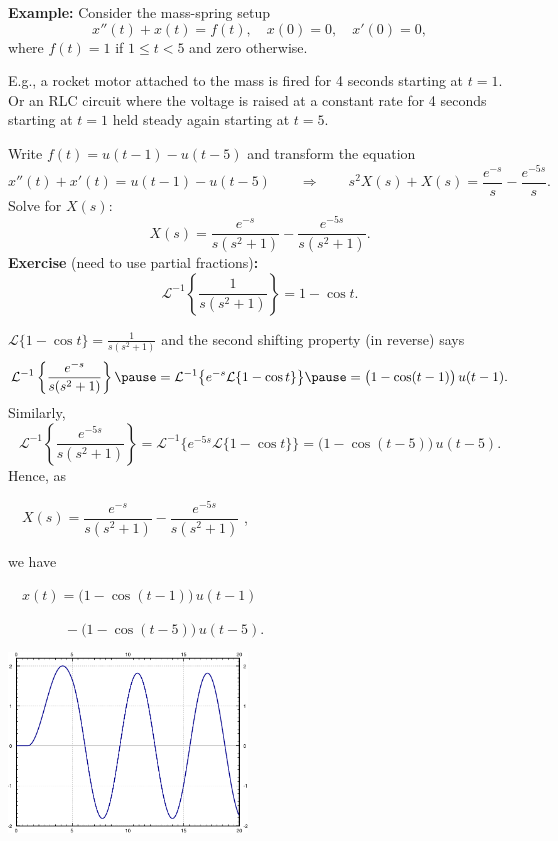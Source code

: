 \documentclass[10pt,aspectratio=169]{beamer}
\begin{document}
\begin{frame}
\textbf{Example:}
Consider the mass-spring setup
\begin{equation*}
x''(t) + x(t) = f(t) , \quad x(0) = 0, \quad x'(0) = 0,
\end{equation*}
where $f(t) = 1$ if $1 \leq t < 5$ and zero otherwise.

\pause
\medskip

E.g., a rocket motor attached to the mass is fired for 4 seconds starting at
$t=1$. \pause  Or an RLC circuit where the voltage is raised
at a constant rate for 4 seconds starting at $t=1$ held steady 
again starting at $t=5$.

\pause
\medskip

Write $f(t) = u(t-1) - u(t-5)$ and transform the equation
\[
x''(t) + x'(t) = 
u(t-1) - u(t-5)
\qquad
\Rightarrow
\qquad
s^2 X(s) + X(s) = \frac{e^{-s}}{s} - \frac{e^{-5s}}{s} .
\]
\pause
Solve for $X(s)$:
\[
X(s) = \frac{e^{-s}}{s(s^2+1)} - \frac{e^{-5s}}{s(s^2+1)} .
\]
\pause
\textbf{Exercise} (need to use partial fractions)\textbf{:}
\begin{equation*}
{\mathcal{L}}^{-1} \left\{ \frac{1}{s(s^2+1)} \right\}
= 1 - \cos t .
\end{equation*}
\end{frame}

\begin{frame}
$\mathcal{L} \{ 1 - \cos t  \} = \frac{1}{s(s^2+1)}$ and the
second shifting property (in reverse) says
\[
{\mathcal{L}}^{-1} \left\{ \frac{e^{-s}}{s(s^2+1)} \right\}
\pause
=
{\mathcal{L}}^{-1} \bigl\{
e^{-s}
\mathcal{L} \{ 1 - \cos t \}
\bigr\}
\pause
=
\bigl( 1 - \cos (t-1) \bigr) \, u(t-1) .
\]
\pause
Similarly,
\[
{\mathcal{L}}^{-1} \left\{ \frac{e^{-5s}}{s(s^2+1)} \right\}
=
{\mathcal{L}}^{-1} \bigl\{
e^{-5s}
\mathcal{L} \{ 1 - \cos t \}
\bigr\}
=
\bigl( 1 - \cos (t-5) \bigr) \, u(t-5) .
\]
\pause
Hence, as

\bigskip

$\quad
X(s) = \dfrac{e^{-s}}{s(s^2+1)} - \dfrac{e^{-5s}}{s(s^2+1)}$ ,

\bigskip
\pause

we have

\medskip

$
\quad
x(t) = 
\bigl( 1 - \cos (t-1) \bigr) \, u(t-1) $

\medskip

$\qquad\qquad {} -
\bigl( 1 - \cos (t-5) \bigr) \, u(t-5)$.

\vspace*{-1.6in}

\hfill
\includegraphics[width=2.5in]{../figures/lt-heavisideex}
\end{frame}
\end{document}
